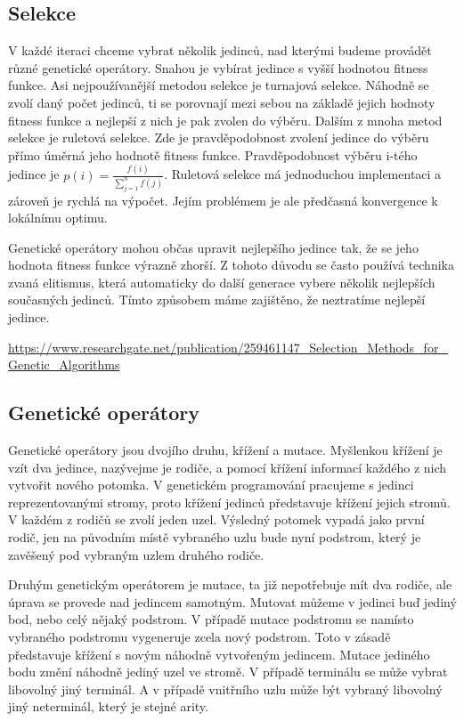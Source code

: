 \subsection{Selekce}
V každé iteraci chceme vybrat několik jedinců, nad kterými budeme provádět různé genetické operátory. Snahou je vybírat jedince s vyšší hodnotou fitness funkce.
Asi nejpoužívanější metodou selekce je turnajová selekce. Náhodně se zvolí daný počet jedinců, ti se porovnají mezi sebou na základě jejich hodnoty fitness funkce a nejlepší z nich je pak zvolen do výběru.
Dalším z mnoha metod selekce je ruletová selekce. Zde je pravděpodobnost zvolení jedince do výběru přímo úměrná jeho hodnotě fitness funkce.
Pravděpodobnost výběru i-tého jedince je 
\newline $p(i) = \frac{f(i)}{\sum_{j=1}^{n} f(j)} $. \newline
Ruletová selekce má jednoduchou implementaci a zároveň je rychlá na výpočet. 
Jejím problémem je ale předčasná konvergence k lokálnímu optimu.
\par
Genetické operátory mohou občas upravit nejlepšího jedince tak, že se jeho hodnota fitness funkce výrazně zhorší.
Z tohoto důvodu se často používá technika zvaná elitismus, která automaticky do další generace vybere několik nejlepších současných jedinců. 
Tímto způsobem máme zajištěno, že neztratíme nejlepší jedince.



\url{https://www.researchgate.net/publication/259461147_Selection_Methods_for_Genetic_Algorithms}

\subsection{Genetické operátory}
Genetické operátory jsou dvojího druhu, křížení a mutace. Myšlenkou křížení je vzít dva jedince, nazývejme je rodiče, a pomocí křížení informací každého z nich vytvořit nového potomka.
V genetickém programování pracujeme s jedinci reprezentovanými stromy, proto křížení jedinců představuje křížení jejich stromů. V každém z rodičů se zvolí jeden uzel. 
Výsledný potomek vypadá jako první rodič, jen na původním místě vybraného uzlu bude nyní podstrom, který je zavěšený pod vybraným uzlem druhého rodiče.
\par
Druhým genetickým operátorem je mutace, ta již nepotřebuje mít dva rodiče, ale úprava se provede nad jedincem samotným.
Mutovat můžeme v jedinci buď jediný bod, nebo celý nějaký podstrom. V případě mutace podstromu se namísto vybraného podstromu vygeneruje zcela nový podstrom. 
Toto v zásadě představuje křížení s novým náhodně vytvořeným jedincem.
\newline
Mutace jediného bodu změní náhodně jediný uzel ve stromě. V případě terminálu se může vybrat libovolný jiný terminál. A v případě vnitřního uzlu může být vybraný libovolný jiný neterminál, který je stejné arity.

